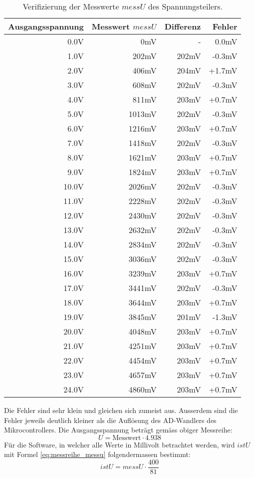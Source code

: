 \begin{table}
\centering
\begin{tabular}{|r|r|r|r|}
	\hline
	\textbf{Ausgangsspannung} & \textbf{Messwert $messU$} & \textbf{Differenz} & \textbf{Fehler} \\ \hline
	0.0V & 0mV & - & 0.0mV \\ \hline
	1.0V & 202mV & 202mV & -0.3mV \\ \hline
	2.0V & 406mV & 204mV & +1.7mV \\ \hline
	3.0V & 608mV & 202mV & -0.3mV \\ \hline
	4.0V & 811mV & 203mV & +0.7mV \\ \hline
	5.0V & 1013mV & 202mV & -0.3mV \\ \hline
	6.0V & 1216mV & 203mV & +0.7mV \\ \hline
	7.0V & 1418mV & 202mV & -0.3mV \\ \hline
	8.0V & 1621mV & 203mV & +0.7mV \\ \hline
	9.0V & 1824mV & 203mV & +0.7mV \\ \hline
	10.0V & 2026mV & 202mV & -0.3mV \\ \hline
	11.0V & 2228mV & 202mV & -0.3mV \\ \hline
	12.0V & 2430mV & 202mV & -0.3mV \\ \hline
	13.0V & 2632mV & 202mV & -0.3mV \\ \hline
	14.0V & 2834mV & 202mV & -0.3mV \\ \hline
	15.0V & 3036mV & 202mV & -0.3mV \\ \hline
	16.0V & 3239mV & 203mV & +0.7mV \\ \hline
	17.0V & 3441mV & 202mV & -0.3mV \\ \hline
	18.0V & 3644mV & 203mV & +0.7mV \\ \hline
	19.0V & 3845mV & 201mV & -1.3mV \\ \hline
	20.0V & 4048mV & 203mV & +0.7mV \\ \hline
	21.0V & 4251mV & 203mV & +0.7mV \\ \hline
	22.0V & 4454mV & 203mV & +0.7mV \\ \hline
	23.0V & 4657mV & 203mV & +0.7mV \\ \hline
	24.0V & 4860mV & 203mV & +0.7mV \\ \hline
\end{tabular}
\caption{Verifizierung der Messwerte $messU$ des Spannungsteilers.}
\label{tab:messU}
\end{table}
Die Fehler sind sehr klein und gleichen sich zumeist aus. Ausserdem sind die Fehler jeweils deutlich kleiner als die Auflösung des AD-Wandlers des Mikrocontrollers. Die Ausgangsspannung beträgt gemäss obiger Messreihe:
\begin{equation}
	U=\text{Messwert}\cdot 4.938
\label{eq:messreihe_messu}
\end{equation}
Für die Software, in welcher alle Werte in Millivolt betrachtet werden, wird $istU$ mit Formel \ref{eq:messreihe_messu} folgendermassen bestimmt:
\begin{equation}
	istU=messU\cdot\frac{400}{81}
\label{eq:messreihe_messu_sw}
\end{equation}


